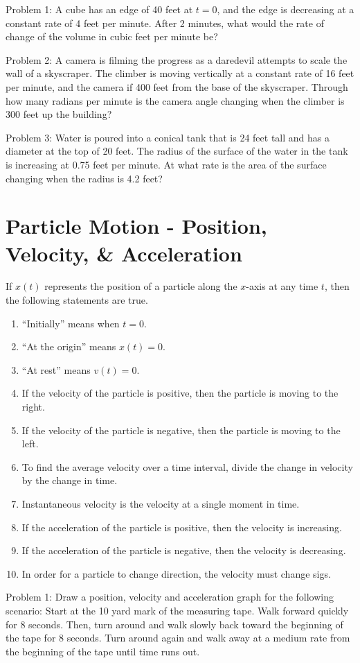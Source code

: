 \documentclass[../abcalc.tex]{subfiles}
\begin{document}
Problem 1: A cube has an edge of 40 feet at $t = 0$, and the edge is decreasing at a constant rate of 4 feet per minute. After 2 minutes,
what would the rate of change of the volume in cubic feet per minute be?

Problem 2: A camera is filming the progress as a daredevil attempts to scale the wall of a skyscraper. The climber is moving vertically 
at a constant rate of 16 feet per minute, and the camera if 400 feet from the base of the skyscraper. Through how many radians per minute 
is the camera angle changing when the climber is 300 feet up the building?

Problem 3: Water is poured into a conical tank that is 24 feet tall and has a diameter at the top of 20 feet. The radius of the surface of the water in the tank 
is increasing at 0.75 feet per minute. At what rate is the area of the surface changing when the radius is 4.2 feet?
\section{Particle Motion - Position, Velocity, \& Acceleration}
If $x(t)$ represents the position of a particle along the $x$-axis at any time $t$, then the following statements are true.
\begin{enumerate}
    \item ``Initially'' means when $t=0$.
    \item ``At the origin'' means $x(t)=0$.
    \item ``At rest'' means $v(t)=0$.
    \item If the velocity of the particle is positive, then the particle is moving to the right.
    \item If the velocity of the particle is negative, then the particle is moving to the left.
    \item To find the average velocity over a time interval, divide the change in velocity by the change in time.
    \item Instantaneous velocity is the velocity at a single moment in time.
    \item If the acceleration of the particle is positive, then the velocity is increasing.
    \item If the acceleration of the particle is negative, then the velocity is decreasing.
    \item In order for a particle to change direction, the velocity must change sigs.
\end{enumerate}
Problem 1: Draw a position, velocity and acceleration graph for the following scenario: Start at the 10 yard mark of the measuring tape.
Walk forward quickly for 8 seconds. Then, turn around and walk slowly back toward the beginning of the tape for 8 seconds. Turn around again 
and walk away at a medium rate from the beginning of the tape until time runs out.
\end{document}
